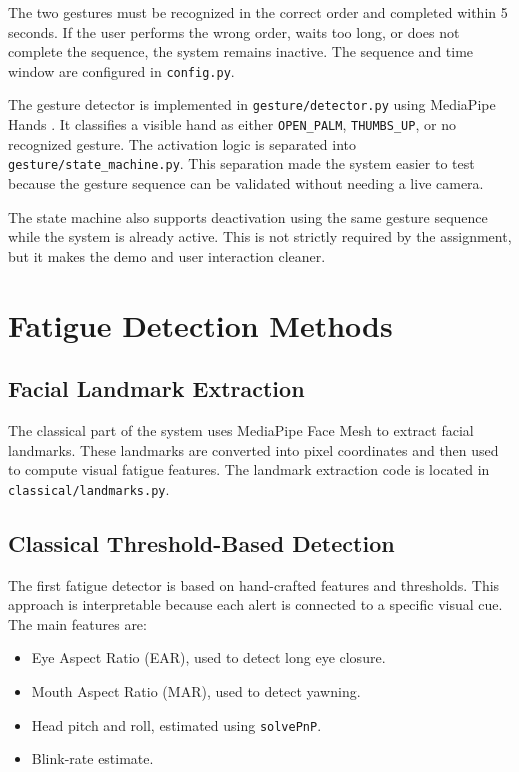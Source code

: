 \documentclass[conference]{IEEEtran}
\begin{document}
The two gestures must be recognized in the correct order and completed within 5 seconds. If the user performs the wrong order, waits too long, or does not complete the sequence, the system remains inactive. The sequence and time window are configured in \texttt{config.py}.

The gesture detector is implemented in \texttt{gesture/detector.py} using MediaPipe Hands \cite{mediapipe}. It classifies a visible hand as either \texttt{OPEN\_PALM}, \texttt{THUMBS\_UP}, or no recognized gesture. The activation logic is separated into \texttt{gesture/state\_machine.py}. This separation made the system easier to test because the gesture sequence can be validated without needing a live camera.

The state machine also supports deactivation using the same gesture sequence while the system is already active. This is not strictly required by the assignment, but it makes the demo and user interaction cleaner.

\section{Fatigue Detection Methods}

\subsection{Facial Landmark Extraction}

The classical part of the system uses MediaPipe Face Mesh \cite{mediapipe} to extract facial landmarks. These landmarks are converted into pixel coordinates and then used to compute visual fatigue features. The landmark extraction code is located in \texttt{classical/landmarks.py}.

\subsection{Classical Threshold-Based Detection}

The first fatigue detector is based on hand-crafted features and thresholds. This approach is interpretable because each alert is connected to a specific visual cue. The main features are:

\begin{itemize}
    \item Eye Aspect Ratio (EAR), used to detect long eye closure.
    \item Mouth Aspect Ratio (MAR), used to detect yawning.
    \item Head pitch and roll, estimated using \texttt{solvePnP}.
    \item Blink-rate estimate.
\end{itemize}
\end{document}
